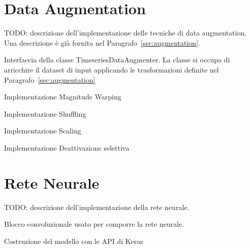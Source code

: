 \section{Data Augmentation}
TODO: descrizione dell'implementazione delle tecniche di data augmentation. Una
descrizione è già fornita nel Paragrafo~\ref{sec:augmentation}.
\begin{listing}[htp]
	\caption{Interfaccia della classe TimeseriesDataAugmenter. La classe si
		occupa di arricchire il dataset di input applicando le trasformazioni
		definite nel Paragrafo~\ref{sec:augmentation}}
\end{listing}

\begin{listing}[htp]
	\caption{Implementazione Magnitude Warping}
\end{listing}

\begin{listing}[htp]
	\caption{Implementazione Shuffling}
\end{listing}

\begin{listing}[htp]
	\caption{Implementazione Scaling}
\end{listing}

\begin{listing}[htp]
	\caption{Implementazione Deattivazione selettiva}
\end{listing}

\section{Rete Neurale}
TODO: descrizione dell'implementazione della rete neurale.

\begin{listing}[htp]
	\caption{Blocco convoluzionale usato per comporre la rete neurale.}
\end{listing}

\begin{listing}[htp]
  \caption{Costruzione del modello con le API di Keras}
\end{listing}


